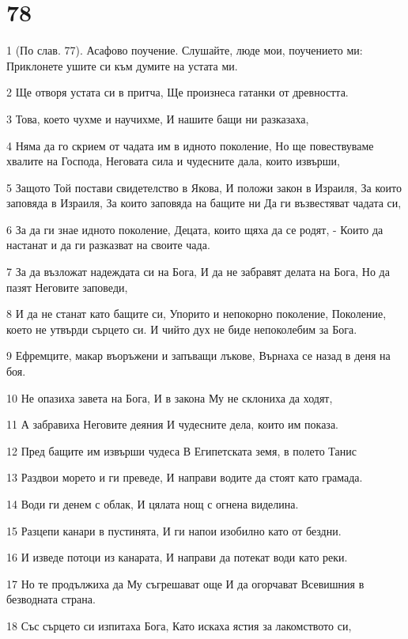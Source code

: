 \chapter{78}

\par 1 (По слав. 77). Асафово поучение. Слушайте, люде мои, поучението ми: Приклонете ушите си към думите на устата ми.
\par 2 Ще отворя устата си в притча, Ще произнеса гатанки от древността.
\par 3 Това, което чухме и научихме, И нашите бащи ни разказаха,
\par 4 Няма да го скрием от чадата им в идното поколение, Но ще повествуваме хвалите на Господа, Неговата сила и чудесните дала, които извърши,
\par 5 Защото Той постави свидетелство в Якова, И положи закон в Израиля, За които заповяда в Израиля, За които заповяда на бащите ни Да ги възвестяват чадата си,
\par 6 За да ги знае идното поколение, Децата, които щяха да се родят, - Които да настанат и да ги разказват на своите чада.
\par 7 За да възложат надеждата си на Бога, И да не забравят делата на Бога, Но да пазят Неговите заповеди,
\par 8 И да не станат като бащите си, Упорито и непокорно поколение, Поколение, което не утвърди сърцето си. И чийто дух не биде непоколебим за Бога.
\par 9 Ефремците, макар въоръжени и запъващи лъкове, Върнаха се назад в деня на боя.
\par 10 Не опазиха завета на Бога, И в закона Му не склониха да ходят,
\par 11 А забравиха Неговите деяния И чудесните дела, които им показа.
\par 12 Пред бащите им извърши чудеса В Египетската земя, в полето Танис
\par 13 Раздвои морето и ги преведе, И направи водите да стоят като грамада.
\par 14 Води ги денем с облак, И цялата нощ с огнена виделина.
\par 15 Разцепи канари в пустинята, И ги напои изобилно като от бездни.
\par 16 И изведе потоци из канарата, И направи да потекат води като реки.
\par 17 Но те продължиха да Му съгрешават още И да огорчават Всевишния в безводната страна.
\par 18 Със сърцето си изпитаха Бога, Като искаха ястия за лакомството си,
